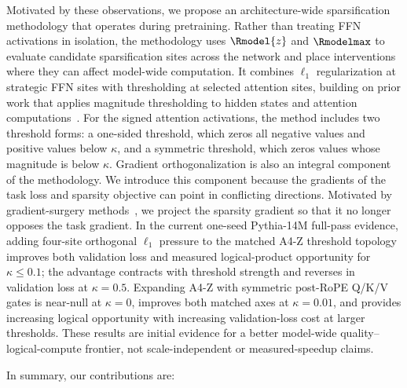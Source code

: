 Motivated by these observations, we propose an architecture-wide sparsification methodology that operates during pretraining. Rather than treating FFN activations in isolation, the methodology uses \(\Rmodel{z}\) and \(\Rmodelmax\) to evaluate candidate sparsification sites across the network and place interventions where they can affect model-wide computation. It combines \(\ell_1\) regularization at strategic FFN sites with thresholding at selected attention sites, building on prior work that applies magnitude thresholding to hidden states and attention computations~\cite{lee2024cats,he2024chess,liu2025teal}. For the signed attention activations, the method includes two threshold forms: a one-sided threshold, which zeros all negative values and positive values below \(\kappa\), and a symmetric threshold, which zeros values whose magnitude is below \(\kappa\). Gradient orthogonalization is also an integral component of the methodology. We introduce this component because the gradients of the task loss and sparsity objective can point in conflicting directions. Motivated by gradient-surgery methods~\cite{yu2020pcgrad}, we project the sparsity gradient so that it no longer opposes the task gradient. In the current one-seed Pythia-14M full-pass evidence, adding four-site orthogonal \(\ell_1\) pressure to the matched A4-Z threshold topology improves both validation loss and measured logical-product opportunity for \(\kappa\le0.1\); the advantage contracts with threshold strength and reverses in validation loss at \(\kappa=0.5\). Expanding A4-Z with symmetric post-RoPE Q/K/V gates is near-null at \(\kappa=0\), improves both matched axes at \(\kappa=0.01\), and provides increasing logical opportunity with increasing validation-loss cost at larger thresholds. These results are initial evidence for a better model-wide quality--logical-compute frontier, not scale-independent or measured-speedup claims.

In summary, our contributions are:

